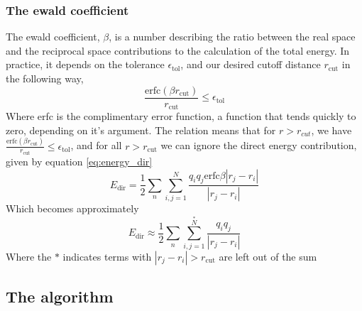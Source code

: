 \documentclass[pdftex,twoside,a4paper]{report}
\begin{document}
\subsubsection{The ewald coefficient}
The ewald coefficient, $\beta$, is a number describing the ratio between the real space and the reciprocal space contributions to the calculation of the total energy. In practice, it depends on the tolerance $\epsilon_\text{tol}$, and our desired cutoff distance $r_{\text{cut}}$ in the following way, \cite{darden:10089} \cite{essmann:8577}\\
\begin{equation}
\frac{\text{erfc}(\beta r_{\text{cut}})}{r_\text{cut}} \leq \epsilon_\text{tol}
\label{eq:ewald_coeff}
\end{equation}
Where erfc is the complimentary error function, a function that tends quickly to zero, depending on it's argument. The relation means that for $r > r_{cut}$, we have $\frac{\text{erfc}(\beta r_{\text{cut}})}{r_\text{cut}} \leq \epsilon_\text{tol}$, and for all $r > r_\text{cut}$ we can ignore the direct energy contribution, given by equation \ref{eq:energy_dir} \cite{essmann:8577}\\
\begin{equation}
E_\text{dir} = \frac{1}{2} \sum_{n} \sum_{i,j = 1} ^N \frac{q_i q_j \text{erfc}{\beta |r_j - r_i|}}{|r_j - r_i|}
\label{eq:energy_dir}
\end{equation}
Which becomes approximately
\begin{equation}
E_\text{dir} \approx \frac{1}{2} \sum_{n} \sum_{i,j = 1} ^{\overset{*}{N}} \frac{q_i q_j}{|r_j - r_i|}
\label{eq:energy_dir_noerfc}
\end{equation}
Where the $*$ indicates terms with $|r_j - r_i| > r_{\text{cut}}$ are left out of the sum





\subsection{The algorithm}
\end{document}
